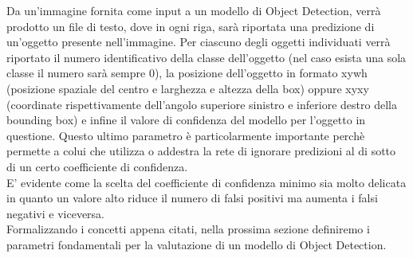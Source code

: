 \documentclass[12pt,a4paper,openright,twoside]{report}
\begin{document}
Da un'immagine fornita come input a un modello di Object Detection, verrà prodotto un file di testo, dove in ogni riga, sarà riportata una predizione di un'oggetto presente nell'immagine.
Per ciascuno degli oggetti individuati verrà riportato il numero identificativo della classe dell'oggetto (nel caso esista una sola classe il numero sarà sempre 0), la posizione dell'oggetto in formato xywh (posizione spaziale del centro e larghezza e altezza della box) oppure xyxy (coordinate rispettivamente dell'angolo superiore sinistro e inferiore destro della bounding box) e infine il valore di confidenza del modello per l'oggetto in questione. Questo ultimo parametro è particolarmente importante perchè permette a colui che utilizza o addestra la rete di ignorare predizioni al di sotto di un certo coefficiente di confidenza.\\ E' evidente come la scelta del coefficiente di confidenza minimo sia molto delicata in quanto un valore alto riduce il numero di falsi positivi ma aumenta i falsi negativi e viceversa.\\
Formalizzando i concetti appena citati, nella prossima sezione definiremo i parametri fondamentali per la valutazione di un modello di Object Detection.
\end{document}
